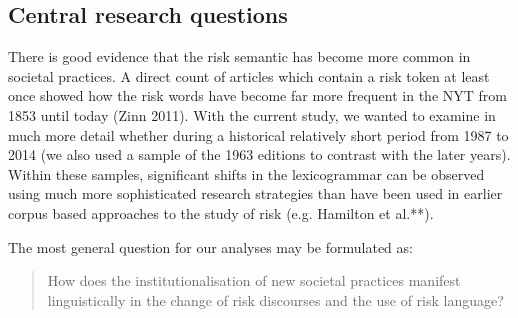\subsection{Central research questions}

There is good evidence that the risk semantic has become more common in societal practices. A direct count of articles which contain a risk token at least once showed how the risk words have become far more frequent in the NYT from 1853 until today (Zinn 2011). With the current study, we wanted to examine in much more detail whether during a historical relatively short period from 1987 to 2014 (we also used a sample of the 1963 editions to contrast with the later years). Within these samples, significant shifts in the lexicogrammar can be observed using much more sophisticated research strategies than have been used in earlier corpus based approaches to the study of risk (e.g. Hamilton et al.**).



The most general question for our analyses may be formulated as:

\begin{quotation}
How does the institutionalisation of new societal practices manifest linguistically in the change of risk discourses and the use of risk language? 
\end{quotation}




